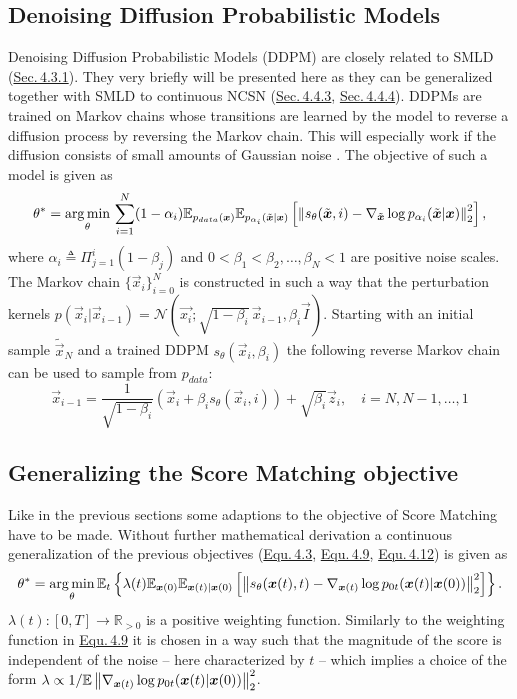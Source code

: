 \subsection{Denoising Diffusion Probabilistic Models}
Denoising Diffusion Probabilistic Models (DDPM) \cite{ho2020denoising} are closely related to SMLD (\hyperref[sec:4.3.1]{Sec.\,4.3.1}). They very briefly will be presented here as they can be generalized together with SMLD to continuous NCSN (\hyperref[sec:4.4.3]{Sec.\,4.4.3}, \hyperref[sec:4.4.4]{Sec.\,4.4.4}). DDPMs are trained on Markov chains whose transitions are learned by the model to reverse a diffusion process by reversing the Markov chain. This will especially work if the diffusion consists of small amounts of Gaussian noise \cite{ho2020denoising}. The objective of such a model is given as 
%
\begin{equation} \label{equ:4.12} 
    \theta^*=\underset{\theta}{\arg\min}\,\sum_{i=1}^N(1-\alpha_i)\mathbb{E}_{p_{data}(\boldsymbol{x})}\mathbb{E}_{p_{\alpha_i}(\tilde{\boldsymbol{x}}|\boldsymbol{x})}\left[\left\lVert s_\theta(\tilde{\boldsymbol{x}},i)-\nabla_{\tilde{\boldsymbol{x}}}\log p_{\alpha_i}(\tilde{\boldsymbol{x}}|\boldsymbol{x})\right\rVert_2^2\right],
\end{equation}
%
where $\alpha_i\triangleq\Pi_{j=1}^i(1-\beta_j)$ and $0<\beta_1<\beta_2,\dots,\beta_N<1$ are positive noise scales. The Markov chain $\{\vec{x}_i\}_{i=0}^N$ is constructed in such a way that the perturbation kernels $p(\vec{x}_i|\vec{x}_{i-1})=\mathcal{N}(\vec{x_i};\sqrt{1-\beta_i}\,\vec{x}_{i-1},\beta_i\vec{I})$. Starting with an initial sample $\tilde{\vec{x}}_N$ and a trained DDPM $s_\theta(\vec{x}_i, \beta_i)$ the following reverse Markov chain can be used to sample from $p_{data}$:
%
\begin{equation} \label{equ:4.13}
    \vec{x}_{i-1}=\frac{1}{\sqrt{1-\beta_i}}(\vec{x}_i+\beta_is_\theta(\vec{x}_i,i))+\sqrt{\beta_i}\vec{z}_i,\quad i=N,N-1,\dots,1
\end{equation}
%
\subsection{Generalizing the Score Matching objective} \label{sec:4.4.3}
Like in the previous sections some adaptions to the objective of Score Matching have to be made. Without further mathematical derivation a continuous generalization of the previous objectives (\hyperref[equ:4.3]{Equ.\,4.3}, \hyperref[equ:4.9]{Equ.\,4.9}, \hyperref[equ:4.12]{Equ.\,4.12}) is given as
%
\begin{equation} \label{equ:4.14}
    \theta^*=\underset{\theta}{\arg\min}\,\mathbb{E}_t\left\{\lambda(t)\mathbb{E}_{\boldsymbol{x}(0)}\mathbb{E}_{\boldsymbol{x}(t)|\boldsymbol{x}(0)}\left[\left\lVert s_\theta(\boldsymbol{x}(t),t)-\nabla_{\boldsymbol{x}(t)}\log p_{0t}(\boldsymbol{x}(t)|\boldsymbol{x}(0))\right\rVert_2^2\right]\right\}.
\end{equation}
%
$\lambda(t):[0,T]\rightarrow\mathbb{R}_{>0}$ is a positive weighting function. Similarly to the weighting function in \hyperref[equ:4.9]{Equ.\,4.9} it is chosen in a way such that the magnitude of the score is independent of the noise – here characterized by $t$ – which implies a choice of the form $\lambda\propto 1/\mathbb{E}\left\lVert\nabla_{\boldsymbol{x}(t)}\log p_{0t}(\boldsymbol{x}(t)|\boldsymbol{x}(0))\right\rVert_2^2$.

